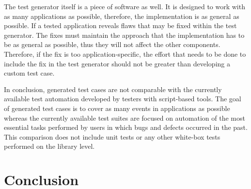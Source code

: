 The test generator itself is a piece of software as well. It is designed to work with as many applications as possible, therefore, the implementation is as general as possible. If a tested application reveals flaws that may be fixed within the test generator. The fixes must maintain the approach that the implementation has to be as general as possible, thus they will not affect the other components. Therefore, if the fix is too application-specific, the effort that needs to be done to include the fix in the test generator should not be greater than developing a custom test case.

In conclusion, generated test cases are not comparable with the currently available test automation developed by testers with script-based tools. The goal of generated test cases is to cover as many events in applications as possible whereas the currently available test suites are focused on automation of the most essential tasks performed by users in which bugs and defects occurred in the past. This comparison does not include unit tests or any other white-box tests performed on the library level.


\chapter{Conclusion}
